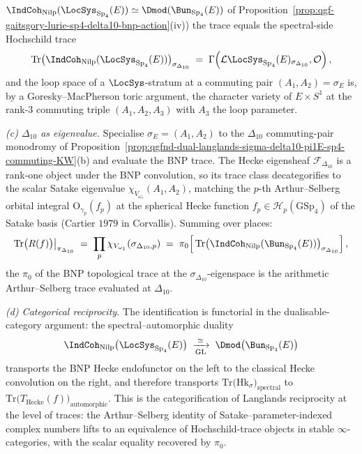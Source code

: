 \begin{proposition}
$\IndCoh_{\mathrm{Nilp}}(\LocSys_{\mathrm{Sp}_4}(E))\simeq
\Dmod(\Bun_{\mathrm{Sp}_4}(E))$ of
Proposition~\ref{prop:qgf-gaitsgory-lurie-sp4-delta10-bnp-action}(iv))
the trace equals the spectral-side Hochschild trace
\[
 \mathrm{Tr}\bigl(\IndCoh_{\mathrm{Nilp}}(\LocSys_{\mathrm{Sp}_4}(E))\bigr)_{\sigma_{\Delta_{10}}}
 \;=\;\Gamma\!\left(\mathcal L\LocSys_{\mathrm{Sp}_4}(E)_{\sigma_{\Delta_{10}}},\mathcal O\right),
\]
and the loop space of a $\LocSys$-stratum at a commuting pair
$(A_1,A_2)=\sigma_E$ is, by a Goresky--MacPherson toric argument, the
character variety of $E\times S^1$ at the rank-$3$ commuting triple
$(A_1,A_2,A_3)$ with $A_3$ the loop parameter.

\emph{(c) $\Delta_{10}$ as eigenvalue.} Specialise $\sigma_E=(A_1,A_2)$
to the $\Delta_{10}$ commuting-pair monodromy of
Proposition~\ref{prop:qgfnd-dual-langlands-sigma-delta10-pi1E-sp4-commuting-KW}(b)
and evaluate the BNP trace. The Hecke eigensheaf
$\mathcal F_{\Delta_{10}}$ is a rank-one object under the BNP
convolution, so its trace class decategorifies to the scalar
Satake eigenvalue $\chi_{V_{\omega_1}}(A_1,A_2)$, matching the
$p$-th Arthur--Selberg orbital integral $\mathrm{O}_{\gamma_p}(f_p)$ at
the spherical Hecke function $f_p\in\mathcal H_p(\mathrm{GSp}_4)$ of the
Satake basis (Cartier $1979$ in Corvallis). Summing over places:
\[
 \mathrm{Tr}\bigl(R(f)\bigr)\big|_{\pi_{\Delta_{10}}}
 \;=\;\prod_p\chi_{V_{\omega_1}}(\sigma_{\Delta_{10},p})
 \;=\;\pi_0\!\left[\,\mathrm{Tr}\bigl(\IndCoh_{\mathrm{Nilp}}(\Bun_{\mathrm{Sp}_4}(E))\bigr)_{\sigma_{\Delta_{10}}}\right],
\]
the $\pi_0$ of the BNP topological trace at the
$\sigma_{\Delta_{10}}$-eigenspace is the arithmetic Arthur--Selberg
trace evaluated at $\Delta_{10}$.

\emph{(d) Categorical reciprocity.} The identification is functorial
in the dualisable-category argument: the spectral--automorphic
duality
\[
 \IndCoh_{\mathrm{Nilp}}\bigl(\LocSys_{\mathrm{Sp}_4}(E)\bigr)
 \;\xrightarrow[\text{GL}]{\simeq}\;
 \Dmod\bigl(\Bun_{\mathrm{Sp}_4}(E)\bigr)
\]
transports the BNP Hecke endofunctor on the left to the classical
Hecke convolution on the right, and therefore transports
$\mathrm{Tr}\bigl(\mathrm{Hk}_{\sigma}\bigr)_{\mathrm{spectral}}$ to
$\mathrm{Tr}\bigl(T_{\mathrm{Hecke}}(f)\bigr)_{\mathrm{automorphic}}$.
This is the categorification of Langlands reciprocity at the level of
traces: the Arthur--Selberg identity of Satake--parameter-indexed
complex numbers lifts to an equivalence of Hochschild-trace objects in
stable $\infty$-categories, with the scalar equality recovered by
$\pi_0$.


\end{proposition}
